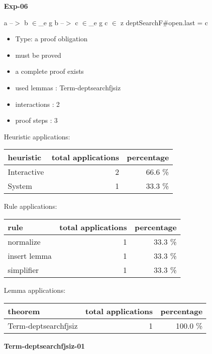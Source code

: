 \documentclass[a4paper]{article}
\begin{document}
{\LARGE\bf Exp-06}\label{lemma-Exp-06}

\medskip

 \Fol a --$>$ b $\in$\_e g \And b --$>$ c $\in$\_e g \And c $\in$ z \Imp \Do deptSearchF\#\Dc open.last = c

\begin{itemize}

\item Type: a proof obligation

\item       must be proved
\item       a complete proof exists
\item       used lemmas  : Term-deptsearchfjsiz
\item       interactions : 2
\item       proof steps  : 3
\end{itemize}

\medskip


Heuristic applications:

\begin{supertabular}{l|r|r}
heuristic	& total applications & percentage \\ \hline
Interactive & 2 & 66.6 \% \\
System & 1 & 33.3 \% \\

\end{supertabular}

Rule applications:

\begin{supertabular}{l|r|r}
rule	        & total applications & percentage \\ \hline
normalize & 1 & 33.3 \% \\
insert lemma & 1 & 33.3 \% \\
simplifier & 1 & 33.3 \% \\

\end{supertabular}

Lemma applications:

\begin{supertabular}{l|r|r}
theorem	        & total applications & percentage \\ \hline
Term-deptsearchfjsiz & 1 & 100.0 \% \\

\end{supertabular}
\pagebreak

{\LARGE\bf Term-deptsearchfjsiz-01}\label{lemma-Term-deptsearchfjsiz-01}
\end{document}
